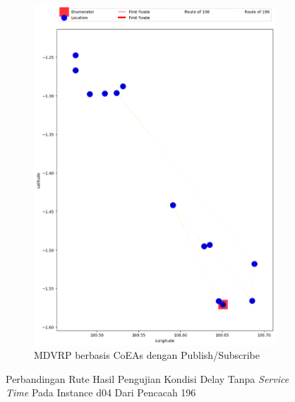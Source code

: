 \begin{figure}[H]\ContinuedFloat
	\centering
	\begin{subfigure}[t]{\textwidth}
		\centering
		\includegraphics[width=\textwidth]{Resources/Images/delayed_4/real_m15_n100_delayed_4_196_pubsub_coes}
		\caption{MDVRP berbasis CoEAs dengan Publish/Subscribe}
		\label{fig:real_m15_n100_delayed_4_196_pubsub_coes}
	\end{subfigure}
	\caption{Perbandingan Rute Hasil Pengujian Kondisi Delay Tanpa \textit{Service Time} Pada Instance d04 Dari Pencacah 196}
	\label{fig:real_m15_n100_delayed_4_196_contd}
\end{figure}


